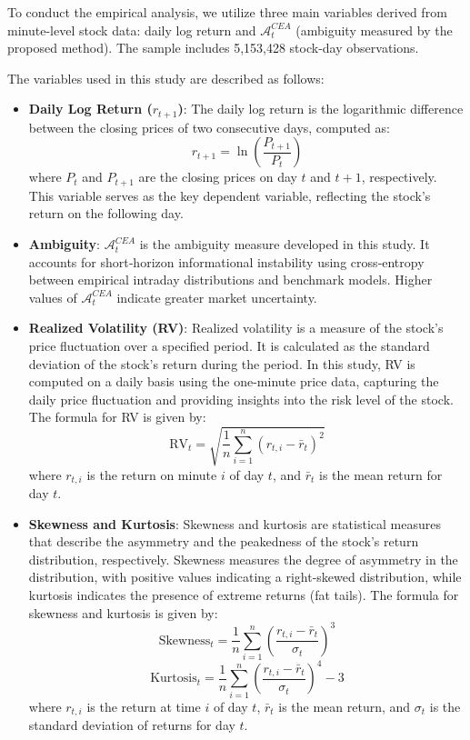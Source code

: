 \documentclass[preprint,12pt,authoryear]{elsarticle}
\begin{document}
To conduct the empirical analysis, we utilize three main variables derived from minute-level stock data: daily log return and \(\mathcal{A}^{CEA}_t\) (ambiguity measured by the proposed method). The sample includes 5,153,428 stock-day observations.

The variables used in this study are described as follows:

\begin{itemize}
    \item \textbf{Daily Log Return ($r_{t+1}$)}: The daily log return is the logarithmic difference between the closing prices of two consecutive days, computed as:
    \[
    r_{t+1} = \ln\left(\frac{P_{t+1}}{P_t}\right)
    \]
    where $P_t$ and $P_{t+1}$ are the closing prices on day $t$ and $t+1$, respectively. This variable serves as the key dependent variable, reflecting the stock's return on the following day.

    \item \textbf{Ambiguity}: \(\mathcal{A}^{CEA}_t\) is the ambiguity measure developed in this study. It accounts for short‑horizon informational instability using cross‑entropy between empirical intraday distributions and benchmark models. Higher values of \(\mathcal{A}^{CEA}_t\) indicate greater market uncertainty.

    \item \textbf{Realized Volatility (RV)}: Realized volatility is a measure of the stock's price fluctuation over a specified period. It is calculated as the standard deviation of the stock's return during the period. In this study, RV is computed on a daily basis using the one-minute price data, capturing the daily price fluctuation and providing insights into the risk level of the stock. The formula for RV is given by:
    \[
    \mathrm{RV}_t = \sqrt{\frac{1}{n} \sum_{i=1}^{n} (r_{t,i} - \bar{r}_t)^2}
    \]
    where $r_{t,i}$ is the return on minute $i$ of day $t$, and $\bar{r}_t$ is the mean return for day $t$.

    \item \textbf{Skewness and Kurtosis}: Skewness and kurtosis are statistical measures that describe the asymmetry and the peakedness of the stock's return distribution, respectively. Skewness measures the degree of asymmetry in the distribution, with positive values indicating a right-skewed distribution, while kurtosis indicates the presence of extreme returns (fat tails). The formula for skewness and kurtosis is given by:
    \[
    \text{Skewness}_t = \frac{1}{n} \sum_{i=1}^{n} \left( \frac{r_{t,i} - \bar{r}_t}{\sigma_t} \right)^3
    \]
    \[
    \text{Kurtosis}_t = \frac{1}{n} \sum_{i=1}^{n} \left( \frac{r_{t,i} - \bar{r}_t}{\sigma_t} \right)^4 - 3
    \]
    where $r_{t,i}$ is the return at time $i$ of day $t$, $\bar{r}_t$ is the mean return, and $\sigma_t$ is the standard deviation of returns for day $t$.


\end{itemize}
\end{document}
